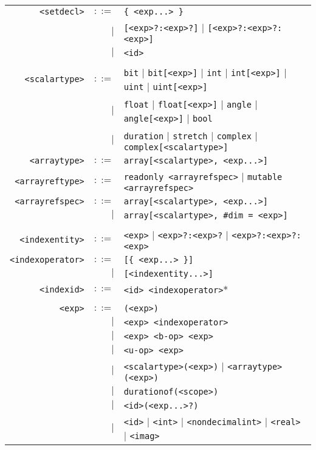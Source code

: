 \documentclass[notitlepage]{article}
\begin{document}
\begin{longtable}{rrl}
	\texttt{<setdecl>} & $::=$ & \texttt{\{ <exp...> \}} \\
	    & $\mid$ & \texttt{[<exp>?:<exp>?]} $\mid$ \texttt{[<exp>?:<exp>?:<exp>]} \\
	    & $\mid$ & \texttt{<id>} \\ \\
	\texttt{<scalartype>} & $::=$ & \texttt{bit} $\mid$ \texttt{bit[<exp>]} $\mid$ \texttt{int} $\mid$ \texttt{int[<exp>]} $\mid$ \texttt{uint} $\mid$ \texttt{uint[<exp>]} \\
	    & $\mid$ & \texttt{float} $\mid$ \texttt{float[<exp>]} $\mid$ \texttt{angle} $\mid$ \texttt{angle[<exp>]} $\mid$ \texttt{bool} \\
	    & $\mid$ & \texttt{duration} $\mid$ \texttt{stretch} $\mid$ \texttt{complex} $\mid$ \texttt{complex[<scalartype>]} \\
	\texttt{<arraytype>} & $::=$ & \texttt{array[<scalartype>, <exp...>]} \\
	\texttt{<arrayreftype>} & $::=$ & \texttt{readonly <arrayrefspec>} $\mid$ \texttt{mutable <arrayrefspec>} \\
	\texttt{<arrayrefspec>} & $::=$ & \texttt{array[<scalartype>, <exp...>]} \\
        & $\mid$ & \texttt{array[<scalartype>, \#dim = <exp>]} \\ \\
	\texttt{<indexentity>} & $::=$ & \texttt{<exp>} $\mid$ \texttt{<exp>?:<exp>?} $\mid$ \texttt{<exp>?:<exp>?:<exp>} \\
	\texttt{<indexoperator>} & $::=$ & \texttt{[\{ <exp...> \}]} \\
	    & $\mid$ & \texttt{[<indexentity...>]} \\
	\texttt{<indexid>} & $::=$ & \texttt{<id> <indexoperator>}* \\ \\
	\texttt{<exp>} & $::=$ & \texttt{(<exp>)} \\
	    & $\mid$ & \texttt{<exp> <indexoperator>} \\
	    & $\mid$ & \texttt{<exp> <b-op> <exp>} \\
	    & $\mid$ & \texttt{<u-op> <exp>} \\
	    & $\mid$ & \texttt{<scalartype>(<exp>)} $\mid$ \texttt{<arraytype>(<exp>)} \\
	    & $\mid$ & \texttt{durationof(<scope>)} \\
	    & $\mid$ & \texttt{<id>(<exp...>?)} \\
	    & $\mid$ & \texttt{<id>} $\mid$ \texttt{<int>} $\mid$ \texttt{<nondecimalint>} $\mid$ \texttt{<real>} $\mid$ \texttt{<imag>} \\

\end{longtable}
\end{document}
